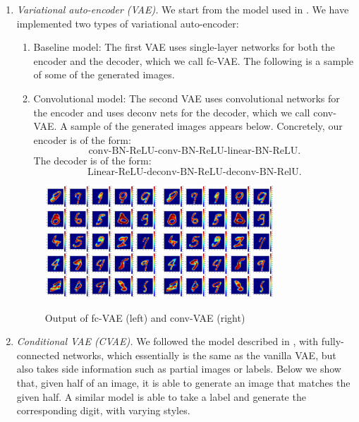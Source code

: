 \documentclass[11pt]{article}
\begin{document}
\begin{enumerate}
    \item \emph{Variational auto-encoder (VAE).} We start from the model used in \cite{kingma2013auto}. We have implemented two types of variational auto-encoder:
    \begin{enumerate}
        \item Baseline model: The first VAE uses single-layer networks for both the encoder and the decoder, which we call fc-VAE. The following is a sample of some of the generated images.
        \item Convolutional model: The second VAE uses convolutional networks for the encoder and  uses deconv nets for the decoder, which we call conv-VAE. A sample of the generated images appears below. Concretely, our encoder is of the form:
        \[\text{conv-BN-ReLU-conv-BN-ReLU-linear-BN-ReLU}.\]
        The decoder is of the form:
        \[\text{Linear-ReLU-deconv-BN-ReLU-deconv-BN-RelU}.\]
    \end{enumerate}
    \begin{figure}[!ht]
        \centering
        \includegraphics[width=0.4\textwidth]{img/fcvae.png}\quad
        \includegraphics[width=0.4\textwidth]{img/fcvae.png}
        \caption{Output of fc-VAE (left) and conv-VAE (right)}
    \end{figure}
    \item \emph{Conditional VAE (CVAE).} We followed the model described in \cite{doersch2016tutorial}, with fully-connected networks, which essentially is the same as the vanilla VAE, but also takes side information such as partial images or labels. Below we show that, given half of an image, it is able to generate an image that matches the given half. A similar model is able to take a label and generate the corresponding digit, with varying styles.

\end{enumerate}
\end{document}
